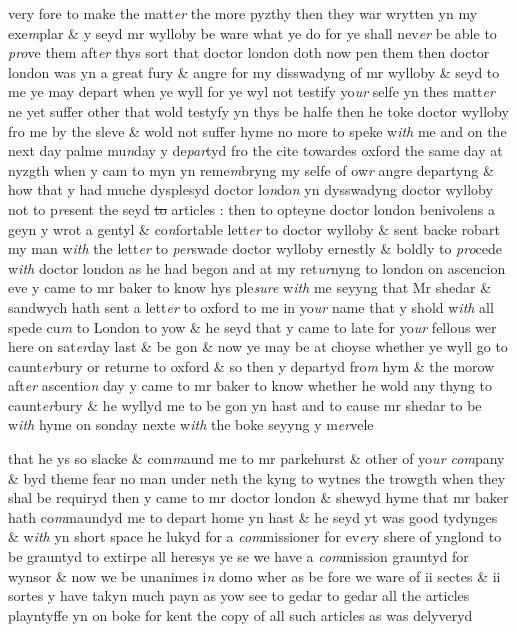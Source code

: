 \documentclass[12pt, a4paper]{book}
\begin{document}
 	
 	
 		
		\ifthenelse{\isodd{\thepage}}
		{\reversemarginpar}
		{\normalmarginpar}
		very fore to make the matt\textit{er} the more pyzthy then they war wrytten yn my exe\textit{m}plar \& y seyd mr wylloby be ware what ye do for ye shall nev\textit{er} be able to \textit{pro}ve them aft\textit{er }thys sort that doctor london doth now pen them then doctor london was yn a great fury \& angre for my disswadyng of mr wylloby \& seyd to me ye may depart when ye wyll for ye wyl not testify yo\textit{ur} selfe yn thes matt\textit{er} ne yet suffer other that wold testyfy yn thys be halfe then he toke doctor wylloby fro me by the sleve \& wold not suffer hyme no more to speke w\textit{ith} me and on the next day palme mu\textit{n}day y de\textit{par}tyd fro the cite towardes oxford the same day at nyzgth when y cam to myn yn reme\textit{m}bryng my selfe of ow\textit{r} angre departyng \& how that y had muche dysplesyd doctor lo\textit{n}do\textit{n} yn dysswadyng doctor wylloby not to p\textit{re}sent the seyd \sout{to }articles : then  to opteyne doctor london benivolens a geyn y wrot a gentyl \& co\textit{n}fortable lett\textit{er} to doctor wylloby \& sent backe robart my man w\textit{ith} the lett\textit{er} to \textit{per}swade doctor wylloby ernestly \& boldly to \textit{pro}cede w\textit{ith} doctor london as he had begon and at my ret\textit{ur}nyng to london on ascencion eve y came to mr baker to know hys ple\textit{sure} w\textit{ith} me seyyng that Mr shedar \& sandwych hath sent a lett\textit{er} to oxford to me in yo\textit{ur} name that y shold w\textit{ith} all spede cu\textit{m} to London to yow \& he seyd that y came to late for yo\textit{ur} fellous wer here on sat\textit{er}day last \& be gon \& now ye may be at choyse whether ye wyll go to caunt\textit{er}bury or returne to oxford \& so then y departyd fro\textit{m} hym \& the morow aft\textit{er} ascentio\textit{n} day y came to mr baker to know whether he wold any thyng to caunt\textit{er}bury \& he wyllyd me to be gon yn hast and to cause mr shedar to be w\textit{ith }hyme on sonday nexte w\textit{ith} the boke seyyng y m\textit{er}vele
 	
			
		\ifthenelse{\isodd{\thepage}}
		{\reversemarginpar}
		{\normalmarginpar}
		that he ys so slacke \& com\textit{m}aund me to mr parkehurst \& other of  yo\textit{ur com}pany \& byd theme fear no man under neth the kyng to wytnes the trowgth when they shal be requiryd then y came to mr doctor london \& shewyd hyme that mr baker hath co\textit{m}maundyd me to depart home yn hast \& he seyd yt was good tydynges \& w\textit{ith }yn short space he lukyd for a \textit{com}missioner for ev\textit{er}y shere of ynglond to be grauntyd to extirpe all heresys ye se we have a \textit{com}mission grauntyd for wynsor \& now we be unanimes i\textit{n} domo wher as be fore we ware of ii sectes \& ii sortes y have takyn much payn as yow see to gedar to gedar all the articles playntyffe yn on boke for kent the copy of all such articles as was delyveryd
 	
\end{document}
